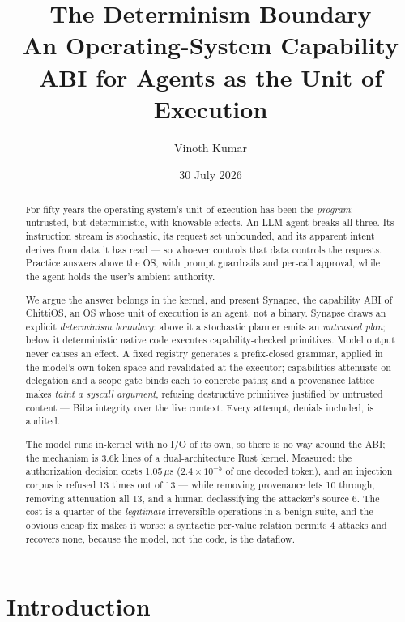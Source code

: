 \documentclass[11pt]{article}
\title{\textbf{The Determinism Boundary}\\[0.4em]
\large An Operating-System Capability ABI for Agents as the Unit of Execution}
\author{Vinoth Kumar}
\date{30 July 2026}
\newcommand{\os}{ChittiOS}
\newcommand{\syn}{Synapse}
\begin{document}
\maketitle

\begin{abstract}
For fifty years the operating system's unit of execution has been the
\emph{program}: untrusted, but deterministic, with knowable effects. An LLM
agent breaks all three. Its instruction stream is stochastic, its request set unbounded, and its
apparent intent derives from data it has read --- so whoever controls that data
controls the requests. Practice answers above
the OS, with prompt guardrails and per-call approval, while the agent holds the
user's ambient authority.

We argue the answer belongs in the kernel, and present \syn{}, the capability
ABI of \os{}, an OS whose unit of execution is an agent, not a binary.
\syn{} draws an explicit \emph{determinism boundary}: above it a stochastic
planner emits an \emph{untrusted plan}; below it deterministic native code
executes capability-checked primitives. Model output never causes an effect. A fixed registry generates a prefix-closed grammar, applied in the
model's own token space and revalidated at the executor; capabilities attenuate
on delegation and a scope gate binds each to concrete paths; and a provenance
lattice makes \emph{taint a syscall argument}, refusing destructive primitives
justified by untrusted content --- Biba integrity over the live context. Every
attempt, denials included, is audited.

The model runs in-kernel with no I/O of its own, so there is no way around the
ABI; the mechanism is 3.6k lines of a dual-architecture Rust kernel. Measured:
the authorization decision costs 1.05\,$\mu$s ($2.4\times10^{-5}$ of one
decoded token), and an injection corpus is refused 13 times out of 13 --- while
removing provenance lets 10 through, removing attenuation all 13, and a human
declassifying the attacker's source 6. The cost is a quarter of the
\emph{legitimate} irreversible operations in a benign suite, and the obvious
cheap fix makes it worse: a syntactic per-value relation permits 4 attacks and
recovers none, because the model, not the code, is the dataflow.
\end{abstract}

\section{Introduction}
\label{sec:intro}
\end{document}
